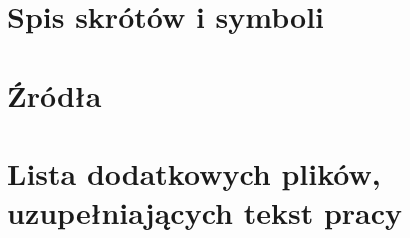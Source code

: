 \documentclass[a4paper,twoside,12pt]{book}
\begin{document}
\backmatter

\printbibliography           %

\begin{appendices}

\chapter{Spis skrótów i symboli}


\chapter{Źródła}


\chapter{Lista dodatkowych plików, uzupełniających tekst pracy} 


\listoffigures
{}
\listoftables
{}

\end{appendices}
\end{document}

